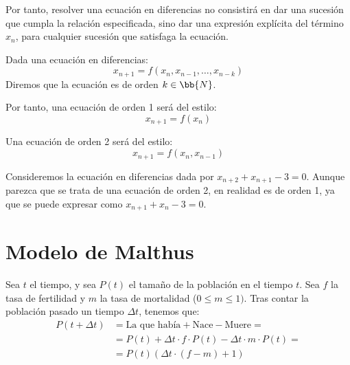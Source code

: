 Por tanto, resolver una ecuación en diferencias no consistirá en dar una sucesión que cumpla la relación especificada, sino dar una expresión explícita del término $x_n$, para cualquier sucesión que satisfaga la ecuación.

\begin{definicion}
    Dada una ecuación en diferencias:
    \begin{equation*}
        x_{n+1} = f(x_n, x_{n-1}, \ldots, x_{n-k})
    \end{equation*}
    Diremos que la ecuación es de orden $k\in \bb{N}$.
\end{definicion}
Por tanto, una ecuación de orden 1 será del estilo:
\begin{equation*}
    x_{n+1} = f(x_n)
\end{equation*}

Una ecuación de orden 2 será del estilo:
\begin{equation*}
    x_{n+1} = f(x_n, x_{n-1})
\end{equation*}

\begin{ejemplo}
    Consideremos la ecuación en diferencias dada por $x_{n+2}+x_{n+1}-3=0$. Aunque parezca que se trata de una ecuación de orden 2, en realidad es de orden 1, ya que se puede expresar como $x_{n+1}+x_n -3 = 0$.
\end{ejemplo}

\section{Modelo de Malthus}
Sea $t$ el tiempo, y sea $P(t)$ el tamaño de la población en el tiempo $t$. Sea $f$ la tasa de fertilidad y $m$ la tasa de mortalidad ($0\leq m \leq 1)$.
Tras contar la población pasado un tiempo $\Delta t$, tenemos que:
\begin{align*}
    P(t+\Delta t) &= \text{La que había}
    + \text{Nace} - \text{Muere} =\\
    &= P(t) + \Delta t \cdot f \cdot P(t) - \Delta t \cdot m \cdot P(t) =\\
    &= P(t)\left(\Delta t \cdot (f-m) + 1\right)
\end{align*}

